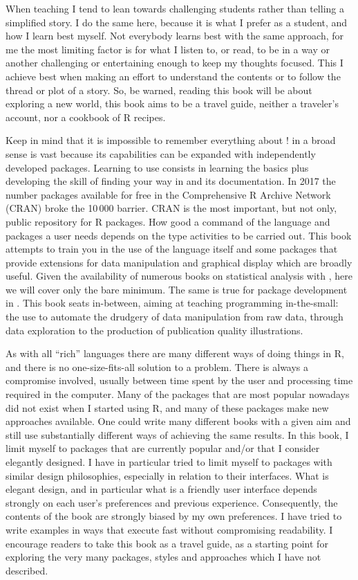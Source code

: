 When teaching I tend to lean towards challenging students rather than telling a simplified story. I do the same here, because it is what I prefer as a student, and how I learn best myself. Not everybody learns best with the same approach, for me the most limiting factor is for what I listen to, or read, to be in a way or another challenging or entertaining enough to keep my thoughts focused. This I achieve best when making an effort to understand the contents or to follow the thread or plot of a story. So, be warned, reading this book will be about exploring a new world, this book aims to be a travel guide, neither a traveler's account, nor a cookbook of R recipes.

Keep in mind that it is impossible to remember everything about \Rpgrm! \Rpgrm in a broad sense is vast because its capabilities can be expanded with independently developed packages. Learning to use \Rlang consists in learning the basics plus developing the skill of finding your way in \Rlang and its documentation.  In 2017 the number packages available for free in the Comprehensive R Archive Network (CRAN) broke the 10\,000 barrier. CRAN is the most important, but not only, public repository for R packages. How good a command of the \Rlang language and packages a user needs depends on the type activities to be carried out. This book attempts to train you in the use of the \Rlang language itself and some packages that provide extensions for data manipulation and graphical display which are broadly useful. Given the availability of numerous books on statistical analysis with \Rlang, here we will cover only the bare minimum. The same is true for package development in \Rlang. This book seats in-between, aiming at teaching programming in-the-small: the use \Rlang to automate the drudgery of data manipulation from raw data, through data exploration to the production of publication quality illustrations.

As with all ``rich'' languages there are many different ways of doing things in R, and there is no one-size-fits-all solution to a problem. There is always a compromise involved, usually between time spent by the user and processing time required in the computer. Many of the packages that are most popular nowadays did not exist when I started using R, and many of these packages make new approaches available. One could write many different \Rlang books with a given aim and still use substantially different ways of achieving the same results. In this book, I limit myself to packages that are currently popular and/or that I consider elegantly designed. I have in particular tried to limit myself to packages with similar design philosophies, especially in relation to their interfaces. What is elegant design, and in particular what is a friendly user interface depends strongly on each user's preferences and previous experience. Consequently, the contents of the book are strongly biased by my own preferences. I have tried to write examples in ways that execute fast without compromising readability. I encourage readers to take this book as a travel guide, as a starting point for exploring the very many packages, styles and approaches which I have not described.

